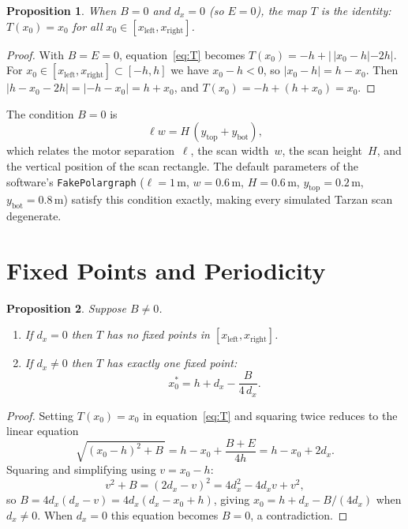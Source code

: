 \documentclass[11pt]{article}
\newtheorem{proposition}{Proposition}
\begin{document}
\begin{proposition}
When $B = 0$ and $d_x = 0$ (so $E = 0$), the map $T$ is the identity:
$T(x_0) = x_0$ for all $x_0 \in [x_{\mathrm{left}}, x_{\mathrm{right}}]$.
\end{proposition}

\begin{proof}
With $B = E = 0$, equation~\eqref{eq:T} becomes
$T(x_0) = -h + |{\,}|x_0 - h| - 2h|$.
For $x_0 \in [x_{\mathrm{left}}, x_{\mathrm{right}}] \subset [-h, h]$
we have $x_0 - h < 0$, so $|x_0 - h| = h - x_0$.
Then $|h - x_0 - 2h| = |{-h - x_0}| = h + x_0$, and
$T(x_0) = -h + (h + x_0) = x_0$.
\end{proof}

The condition $B = 0$ is
\begin{equation}\label{eq:degen}
  \ell w = H\,(y_{\mathrm{top}} + y_{\mathrm{bot}}),
\end{equation}
which relates the motor separation~$\ell$, the scan width~$w$,
the scan height~$H$, and the vertical position of the scan
rectangle. The default parameters of the software's
\texttt{FakePolargraph} ($\ell = 1$\,m, $w = 0.6$\,m,
$H = 0.6$\,m, $y_{\mathrm{top}} = 0.2$\,m,
$y_{\mathrm{bot}} = 0.8$\,m) satisfy this condition exactly, making
every simulated Tarzan scan degenerate.

\section{Fixed Points and Periodicity}

\begin{proposition}\label{prop:fp}
Suppose $B \ne 0$.
\begin{enumerate}
  \item If $d_x = 0$ then $T$ has no fixed points in
        $[x_{\mathrm{left}}, x_{\mathrm{right}}]$.
  \item If $d_x \ne 0$ then $T$ has exactly one fixed point:
        \begin{equation}\label{eq:fp}
          x_0^* = h + d_x - \frac{B}{4\,d_x}.
        \end{equation}
\end{enumerate}
\end{proposition}

\begin{proof}
Setting $T(x_0) = x_0$ in equation~\eqref{eq:T} and squaring twice
reduces to the linear equation
\begin{equation}
  \sqrt{(x_0 - h)^2 + B\,} = h - x_0 + \frac{B + E}{4h} = h - x_0 + 2d_x.
\end{equation}
Squaring and simplifying using $v = x_0 - h$:
\begin{equation}
  v^2 + B = (2d_x - v)^2 = 4d_x^2 - 4d_x v + v^2,
\end{equation}
so $B = 4d_x(d_x - v) = 4d_x(d_x - x_0 + h)$, giving
$x_0 = h + d_x - B/(4d_x)$ when $d_x \ne 0$.
When $d_x = 0$ this equation becomes $B = 0$, a contradiction.
\end{proof}
\end{document}
